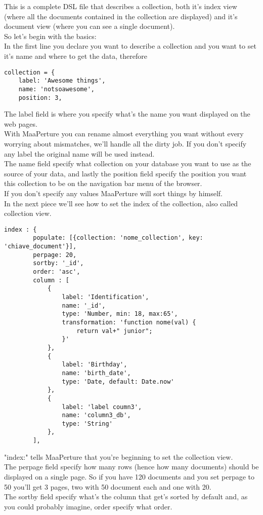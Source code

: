This is a complete DSL file that describes a collection, both it's index view (where all the documents contained in the collection are displayed) and it's document view (where you can see a single document).\\

So let's begin with the basics:\\
In the first line you declare you want to describe a collection and you want to set it's name and where to get the data, therefore

\begin{lstlisting}
collection = {
	label: 'Awesome things',
	name: 'notsoawesome',
	position: 3,
\end{lstlisting}

The label field is where you specify what's the name you want displayed on the web pages.\\
With MaaPerture you can rename almost everything you want without every worrying about mismatches, we'll handle all the dirty job.
If you don't specify any label the original name will be used instead.\\
The name field specify what collection on your database you want to use as the source of your data, and lastly the position field specify the position you want this collection to be on the navigation bar menu of the browser.\\
If you don't specify any values MaaPerture will sort things by himself.\\

In the next piece we'll see how to set the index of the collection, also called collection view.\\

\begin{lstlisting}
index : {
		populate: [{collection: 'nome_collection', key: 'chiave_document'}],
		perpage: 20,
		sortby: '_id',
		order: 'asc',
		column : [
			{
				label: 'Identification',
				name: '_id',
				type: 'Number, min: 18, max:65',
				transformation: 'function nome(val) { 	
					return val+" junior";				
				}'
			},
			{	
				label: 'Birthday',
				name: 'birth_date',
				type: 'Date, default: Date.now'
			},
			{	
				label: 'label coumn3',
				name: 'column3_db',
				type: 'String'
			},
		],
\end{lstlisting}

"index:" tells MaaPerture that you're beginning to set the collection view.\\
The perpage field specify how many rows (hence how many documents) should be displayed on a single page. So if you have 120 documents and you set perpage to 50 you'll get 3 pages, two with 50 document each and one with 20.\\
The sortby field specify what's the column that get's sorted by default and, as you could probably imagine, order specify what order.\\


